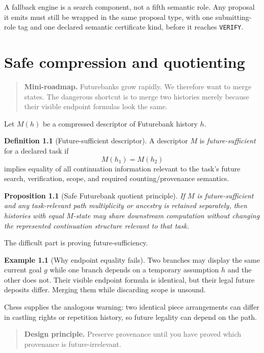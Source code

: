 \documentclass[11pt,openany]{book}
\newtheorem{proposition}[theorem]{Proposition}
\theoremstyle{definition}
\newtheorem{definition}[theorem]{Definition}
\newtheorem{example}[theorem]{Example}
\theoremstyle{remark}
\newenvironment{miniroadmap}{\begin{quote}\small\color{deepblue}\textbf{Mini-roadmap.} }{\end{quote}}
\newenvironment{designbox}{\begin{quote}\small\color{green!35!black}\textbf{Design principle.} }{\end{quote}}
\begin{document}
A fallback engine is a search component, not a fifth semantic role. Any proposal it emits must still be wrapped in the same proposal type, with one submitting-role tag and one declared semantic certificate kind, before it reaches \texttt{VERIFY}.

\chapter{Safe compression and quotienting}
\begin{miniroadmap}
Futurebanks grow rapidly. We therefore want to merge states. The dangerous shortcut is to merge two histories merely because their visible endpoint formulas look the same.
\end{miniroadmap}

Let $M(h)$ be a compressed descriptor of Futurebank history $h$.

\begin{definition}[Future-sufficient descriptor]
A descriptor $M$ is \emph{future-sufficient} for a declared task if
\[
M(h_1)=M(h_2)
\]
implies equality of all continuation information relevant to the task's future search, verification, scope, and required counting/provenance semantics.
\end{definition}

\begin{proposition}[Safe Futurebank quotient principle]\label{prop:safequotient}
If $M$ is future-sufficient and any task-relevant path multiplicity or ancestry is retained separately, then histories with equal $M$-state may share downstream computation without changing the represented continuation structure relevant to that task.
\end{proposition}

The difficult part is proving future-sufficiency.

\begin{example}[Why endpoint equality fails]
Two branches may display the same current goal $g$ while one branch depends on a temporary assumption $h$ and the other does not. Their visible endpoint formula is identical, but their legal future deposits differ. Merging them while discarding scope is unsound.
\end{example}

Chess supplies the analogous warning: two identical piece arrangements can differ in castling rights or repetition history, so future legality can depend on the path.

\begin{designbox}
Preserve provenance until you have proved which provenance is future-irrelevant.
\end{designbox}
\end{document}
